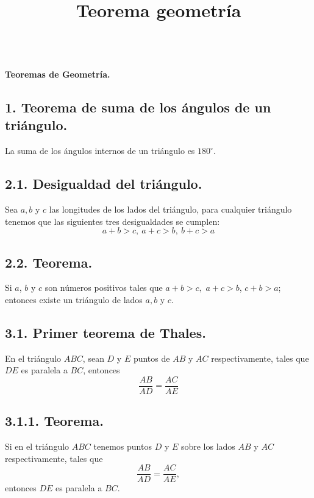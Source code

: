 \documentclass[12pt,a4paper]{article}
\title{Teorema geometría}
\begin{document}
\begin{figure}
\end{figure}
\cfoot{}
\begin{center}
\textbf{\LARGE{\\Teoremas de Geometría.}}
\end{center}
\subsection*{1. Teorema de suma de los ángulos de un triángulo.} 
La suma de los ángulos internos de un triángulo es $180^\circ$.
\subsection*{2.1. Desigualdad del triángulo.}
Sea $a, b$ y $c$ las longitudes de los lados del triángulo, para cualquier triángulo tenemos que las siguientes tres desigualdades se cumplen:
$$a+b>c,\> a+c>b, \> b+c>a$$
\subsection*{2.2. Teorema.}
Si $a$, $b$ y $c$ son números positivos tales que $a+b>c,$ $a+c>b$, $c+b>a$; entonces existe un triángulo de lados $a, b$ y $c$.
\subsection*{3.1. Primer teorema de Thales.}
En el triángulo $ABC$, sean $D$ y $E$ puntos de $AB$
y $AC$ respectivamente, tales que $DE$ es paralela a $BC$, entonces $$\dfrac{AB}{AD}=\dfrac{AC}{AE}$$
\subsection*{3.1.1. Teorema.}
 Si en el triángulo $ABC$ tenemos puntos $D$ y $E$ sobre los lados $AB$ y $AC$ respectivamente, tales que $$\dfrac{AB}{AD}=\dfrac{AC}{AE},$$
entonces $DE$ es paralela a $BC$.
\end{document}
